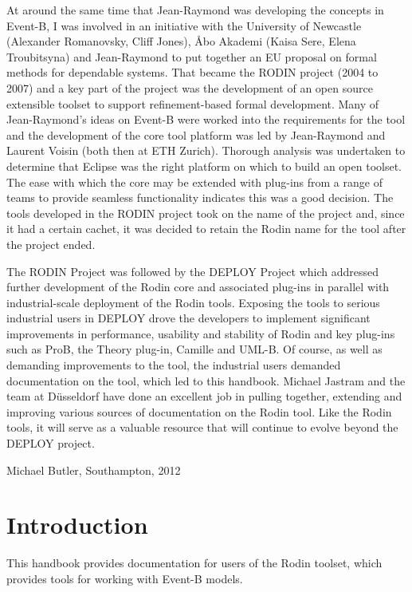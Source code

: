 \documentclass[12pt]{book}
\begin{document}
At around the same time that Jean-Raymond was developing the concepts in Event-B, I was involved in an initiative with the University of Newcastle (Alexander Romanovsky, Cliff Jones), {\AA}bo Akademi  (Kaisa Sere, Elena Troubitsyna) and Jean-Raymond to put together an EU proposal on formal methods for dependable systems.  That became the RODIN project (2004 to 2007) and a key part of the project was the development of an open source extensible toolset to support refinement-based formal development.  Many of Jean-Raymond’s ideas on Event-B were worked into the requirements for the tool and the development of the core tool platform was led by Jean-Raymond and Laurent Voisin (both then at ETH Zurich). Thorough analysis was undertaken to determine that Eclipse was the right platform on which to build an open toolset.  The ease with which the core may be extended with plug-ins from a range of teams to provide seamless functionality indicates this was a good decision. The tools developed in the RODIN project took on the name of the project and, since it had a certain cachet, it was decided to retain the Rodin name for the tool after the project ended.

The RODIN Project was followed by the DEPLOY Project which addressed further development of the Rodin core and associated plug-ins in parallel with industrial-scale deployment of the Rodin tools.  Exposing the tools to serious industrial users in DEPLOY drove the developers to implement significant improvements in performance, usability and stability of Rodin and key plug-ins such as ProB, the Theory plug-in, Camille and UML-B.  Of course, as well as demanding improvements to the tool, the industrial users demanded documentation on the tool, which led to this handbook.  Michael Jastram and the team at D\"{u}sseldorf have done an excellent job in pulling together, extending and improving various sources of documentation on the Rodin tool.  Like the Rodin tools, it will serve as a valuable resource that will continue to evolve beyond the DEPLOY project.

\begin{flushright}Michael Butler, Southampton, 2012\end{flushright}

\chapter{Introduction}
\label{introduction}

This handbook provides documentation for users of the Rodin toolset, which provides tools for working with Event-B models.
\end{document}
